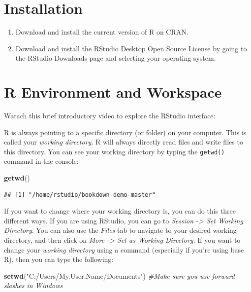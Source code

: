 \documentclass[]{book}
\newenvironment{Shaded}{\begin{snugshade}}{\end{snugshade}}
\newcommand{\KeywordTok}[1]{\textcolor[rgb]{0.13,0.29,0.53}{\textbf{{#1}}}}
\newcommand{\StringTok}[1]{\textcolor[rgb]{0.31,0.60,0.02}{{#1}}}
\newcommand{\CommentTok}[1]{\textcolor[rgb]{0.56,0.35,0.01}{\textit{{#1}}}}
\newcommand{\NormalTok}[1]{{#1}}
\begin{document}
\section{Installation}\label{installation}

\begin{enumerate}
\def\labelenumi{\arabic{enumi}.}
\item
  Download and install the current version of R on CRAN.
\item
  Download and install the RStudio Desktop Open Source License by going
  to the RStudio Downloads page and selecting your operating system.
\end{enumerate}

\section{R Environment and Workspace}\label{r-environment-and-workspace}

Watach this brief introductory video to explore the RStudio interface:

R is always pointing to a specific directory (or folder) on your
computer. This is called your \emph{working directory}. R will always
directly read files and write files to this directory. You can see your
working directory by typing the \texttt{getwd()} command in the console:

\begin{Shaded}
\begin{Highlighting}[]
\KeywordTok{getwd}\NormalTok{()}
\end{Highlighting}
\end{Shaded}

\begin{verbatim}
## [1] "/home/rstudio/bookdown-demo-master"
\end{verbatim}

If you want to change where your working directory is, you can do this
three different ways. If you are using RStudio, you can go to
\emph{Session -\textgreater{} Set Working Directory}. You can also use
the \emph{Files} tab to navigate to your desired working directory, and
then click on \emph{More -\textgreater{} Set as Working Directory}. If
you want to change your \emph{working directory} using a command
(especially if you're using base R), then you can type the following:

\begin{Shaded}
\begin{Highlighting}[]
\KeywordTok{setwd}\NormalTok{(}\StringTok{"C:/Users/My.User.Name/Documents"}\NormalTok{)  }\CommentTok{#Make sure you use forward slashes in Windows}
\end{Highlighting}
\end{Shaded}
\end{document}
